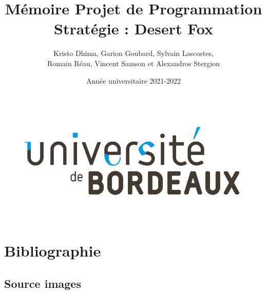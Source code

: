 \documentclass{article}[a4paper, 12pt]
\title{\LARGE \textbf{Mémoire Projet de Programmation  } \\ \Large \textbf{Stratégie : Desert Fox}}
\author{Kristo Dhima, Garion Goubard, Sylvain Lascostes, \\Romain Réau, Vincent Samson et Alexandros Stergiou }
\date{Année universitaire 2021-2022}
\begin{document}
\maketitle
\begin{center}
    \center
    \includegraphics[scale=0.2]{data/Universite_Bordeaux_RVB-10.jpg}

\end{center}





\newpage

{\hypersetup{hidelinks} \tableofcontents} %


\newpage



\newpage


\newpage







\section{Bibliographie}




\subsection{Source images}

\printendnotes


\end{document}
